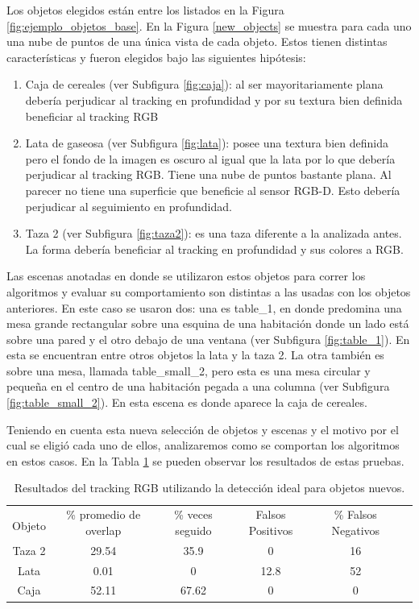 Los objetos elegidos están entre los listados en la Figura \ref{fig:ejemplo_objetos_base}. En la Figura \ref{new_objects} se muestra para cada uno una nube de puntos de una única vista de cada objeto. Estos tienen distintas características y fueron elegidos bajo las siguientes hipótesis:
\begin{enumerate}
	\item Caja de cereales (ver Subfigura \ref{fig:caja}): al ser mayoritariamente plana debería perjudicar al tracking en profundidad y por su textura bien definida beneficiar al tracking RGB
	\item Lata de gaseosa (ver Subfigura \ref{fig:lata}): posee una textura bien definida pero el fondo de la imagen es oscuro al igual que la lata por lo que debería perjudicar al tracking RGB. Tiene una nube de puntos bastante plana. Al parecer no tiene una superficie que beneficie al sensor RGB-D. Esto debería perjudicar al seguimiento en profundidad.
	\item Taza 2 (ver Subfigura \ref{fig:taza2}): es una taza diferente a la analizada antes. La forma debería beneficiar al tracking en profundidad y sus colores a RGB.
\end{enumerate}

Las escenas anotadas en donde se utilizaron estos objetos para correr los algoritmos y evaluar su comportamiento son distintas a las usadas con los objetos anteriores. En este caso se usaron dos: una es table\_1, en donde predomina una mesa grande rectangular sobre una esquina de una habitación donde un lado está sobre una pared y el otro debajo de una ventana (ver Subfigura \ref{fig:table_1}). En esta se encuentran entre otros objetos la lata y la taza 2. La otra también es sobre una mesa, llamada table\_small\_2, pero esta es una mesa circular y pequeña en el centro de una habitación pegada a una columna (ver Subfigura \ref{fig:table_small_2}). En esta escena es donde aparece la caja de cereales.


Teniendo en cuenta esta nueva selección de objetos y escenas y el motivo por el cual se eligió cada uno de ellos, analizaremos como se comportan los algoritmos en estos casos. En la Tabla \ref{tabla_rgb_nuevos} se pueden observar los resultados de estas pruebas.

\begin{table}[h]
	\centering
    \begin{tabular}{|c|c|c|c|c|c|}
    \hline
    & \multirow{2}{2.4cm}{\% promedio de overlap} & \multirow{2}{2cm}{\% veces seguido} & \multirow{2}{1.6cm}{Falsos Positivos} & \multirow{2}{1.6cm}{\% Falsos Negativos}\\
	Objeto & & & &\\
    \hline
    Taza 2  & 29.54      &  35.9     & 0        &  16 \\
    \hline
    Lata    &  0.01      &     0     & 12.8     &  52 \\
    \hline
    Caja    & 52.11      & 67.62     & 0        &   0 \\
    \hline
    \end{tabular}
\caption{Resultados del tracking RGB utilizando la detección ideal para objetos nuevos.}
\label{tabla_rgb_nuevos}
\end{table}

